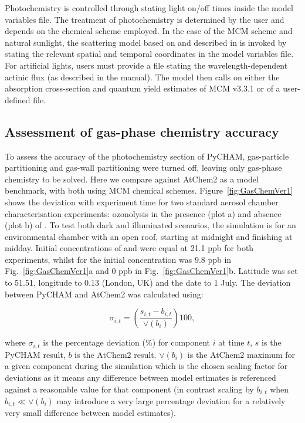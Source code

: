 \documentclass[gmd, manuscript]{copernicus}
\begin{document}
Photochemistry is controlled through stating light on/off times inside the model variables file.  The treatment of photochemistry is determined by the user and depends on the chemical scheme employed.  In the case of the MCM scheme and natural sunlight, the scattering model based on \citet{Hayman1997} and described in \citet{Saunders2003} is invoked by stating the relevant spatial and temporal coordinates in the model variables file.  For artificial lights, users must provide a file stating the wavelength-dependent actinic flux (as described in the manual).  The model then calls on either the absorption cross-section and quantum yield estimates of MCM v3.3.1 or of a user-defined file.

\subsection{Assessment of gas-phase chemistry accuracy}

To assess the accuracy of the photochemistry section of PyCHAM, gas-particle partitioning and gas-wall partitioning were turned off, leaving only gas-phase chemistry to be solved.  Here we compare against AtChem2 \citep{Sommariva2018} as a model benchmark, with both using MCM chemical schemes.  Figure~\ref{fig:GasChemVer1} shows the deviation with experiment time for two standard aerosol chamber characterisation experiments:  ozonolysis in the presence (plot a) and absence (plot b) of .  To test both dark and illuminated scenarios, the simulation is for an environmental chamber with an open roof, starting at midnight and finishing at midday.  Initial concentrations of  and  were equal at 21.1 \unit{ppb} for both experiments, whilst for  the initial concentration was 9.8 \unit{ppb} in Fig.~\ref{fig:GasChemVer1}a and 0 \unit{ppb} in Fig.~\ref{fig:GasChemVer1}b.  Latitude was set to 51.51, longitude to 0.13 (London, UK) and the date to 1 July.  The deviation between PyCHAM and AtChem2 was calculated using:

\begin{equation} \label{eq:frac_dev}
\sigma_{i,t} = \left(\frac{s_{i,t}-b_{i,t}}{\lor(b_{i})}\right)100\mathrm{,}
\end{equation}

where $\sigma_{i,t}$ is the percentage deviation (\%) for component $i$ at time $t$, $s$ is the PyCHAM result, $b$ is the AtChem2 result.  $\lor(b_{i})$ is the AtChem2 maximum for a given component during the simulation which is the chosen scaling factor for deviations as it means any difference between model estimates is referenced against a reasonable value for that component (in contrast scaling by $b_{i,t}$ when $b_{i,t} \ll \lor(b_{i})$ may introduce a very large percentage deviation for a relatively very small difference between model estimates).
\end{document}
